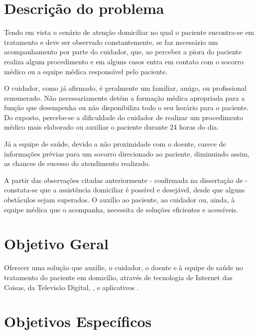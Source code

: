 \section{Descrição do problema}\label{sec:descricao-problema}

Tendo em vista o cenário de atenção domiciliar no qual o paciente
encontra-se em tratamento e deve ser observado constantemente, 
se faz necessário um acompanhamento por parte do cuidador, que, ao perceber 
a piora do paciente realiza algum procedimento e em alguns casos entra 
em contato com o socorro médico ou a equipe médica responsável pelo paciente.

O cuidador, como já afirmado, é geralmente um familiar, amigo, ou profissional
remunerado. Não necessariamente detém a formação médica apropriada para a função que 
desempenha ou não disponibiliza todo o seu horário para o paciente. Do exposto,
percebe-se a dificuldade do cuidador de realizar um procedimento médico mais
elaborado ou auxiliar o paciente durante 24 horas do dia.

Já a equipe de saúde, devido a não proximidade com o doente, carece de informações
prévias para um socorro direcionado ao paciente, diminuindo assim, as chances de
sucesso do atendimento realizado.


A partir das observações citadas anteriormente - confirmada na dissertação
de  - constata-se que a assistência
domiciliar é possível e desejável, desde que alguns obstáculos sejam superados.
O auxílio ao paciente, ao cuidador ou, ainda, à equipe médica que o
acompanha, necessita de soluções eficientes e acessíveis.

\section{Objetivo Geral}\label{sec:objetivos}

Oferecer uma solução que auxilie, o cuidador, o doente e à equipe de saúde no tratamento 
do paciente em domicílio, através de tecnologia de Internet das Coisas, da Televisão Digital,
\smartphones, e aplicativos \web.

\section{Objetivos Específicos}

